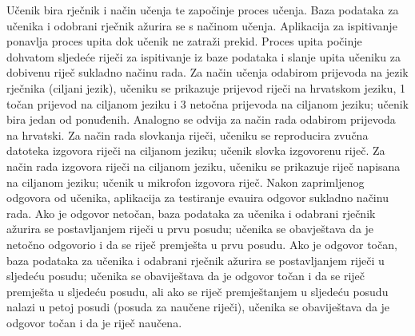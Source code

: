 				{Učenik bira rječnik i način učenja te započinje proces učenja. Baza podataka za učenika i odobrani rječnik ažurira se s načinom učenja. Aplikacija za ispitivanje ponavlja proces upita dok učenik ne zatraži prekid. Proces upita počinje dohvatom sljedeće riječi za ispitivanje iz baze podataka i slanje upita učeniku za dobivenu riječ sukladno načinu rada. Za način učenja odabirom prijevoda na jezik rječnika (ciljani jezik), učeniku se prikazuje prijevod riječi na hrvatskom jeziku, 1 točan prijevod na ciljanom jeziku i 3 netočna prijevoda na ciljanom jeziku; učenik bira jedan od ponuđenih. Analogno se odvija za način rada odabirom prijevoda na hrvatski. Za način rada slovkanja riječi, učeniku se reproducira zvučna datoteka izgovora riječi na ciljanom jeziku; učenik slovka izgovorenu riječ. Za način rada izgovora riječi na ciljanom jeziku, učeniku se prikazuje riječ napisana na ciljanom jeziku; učenik u mikrofon izgovora riječ. Nakon zaprimljenog odgovora od učenika, aplikacija za testiranje evauira odgovor sukladno načinu rada. Ako je odgovor netočan, baza podataka za učenika i odabrani rječnik ažurira se postavljanjem riječi u prvu posudu; učenika se obavještava da je netočno odgovorio i da se riječ premješta u prvu posudu. Ako je odgovor točan, baza podataka za učenika i odabrani rječnik ažurira se postavljanjem riječi u sljedeću posudu; učenika se obaviještava da je odgovor točan i da se riječ premješta u sljedeću posudu, ali ako se riječ premještanjem u sljedeću posudu nalazi u petoj posudi (posuda za naučene riječi), učenika se obaviještava da je odgovor točan i da je riječ naučena.}
				\eject
				
